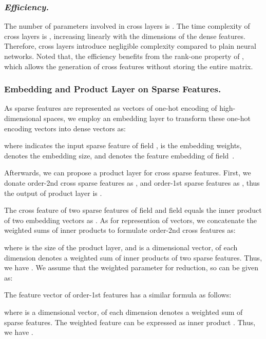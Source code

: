 \documentclass[letterpaper]{article} \usepackage{aaai21}  \usepackage{times}  \usepackage{helvet} \usepackage{courier}  \usepackage[hyphens]{url}  \usepackage{graphicx} \urlstyle{rm} \def\UrlFont{\rm}  \usepackage{natbib}  \usepackage{caption} \frenchspacing  \setlength{\pdfpagewidth}{8.5in}  \setlength{\pdfpageheight}{11in}  \usepackage{graphicx}
\begin{document}
\subsubsection{{\em Efficiency.}} The number of parameters involved in  cross layers is . The time complexity of cross layers is , increasing linearly with the dimensions of the dense features. Therefore, cross layers introduce negligible complexity compared to plain neural networks. Noted that, the efficiency benefits from the rank-one property of , which allows the generation of cross features without storing the entire matrix.


\subsubsection{Embedding and Product Layer on Sparse Features.}
As sparse features  are represented as vectors of one-hot encoding of high-dimensional spaces, we employ an embedding layer to transform these one-hot encoding vectors into dense vectors  as:
\begin{small}

\end{small}where  indicates the input sparse feature of field ,  is the embedding weights,  denotes the embedding size, and  denotes the feature embedding of field~.

Afterwards, we can propose a product layer for cross sparse features. First, we donate order-2nd cross sparse features as , and order-1st sparse features as , thus the output of product layer is .

The cross feature of two sparse features of field  and field  equals the inner product of two embedding vectors as . As for represention of vectors, we concatenate the weighted sums of inner products to formulate order-2nd cross features as: 
\begin{small}

\end{small}where  is the size of the product layer, and  is a  dimensional vector, of each dimension  denotes a weighted sum of inner products of two sparse features. Thus, we have . We assume that the weighted parameter  for reduction, so  can be given as: 
\begin{small}

\end{small}The feature vector of order-1st features has a similar formula as follows: 
\begin{small}

\end{small}where  is a  dimensional vector, of each dimension  denotes a weighted sum of sparse features. The weighted feature can be expressed as inner product . Thus, we have . 
\end{document}
